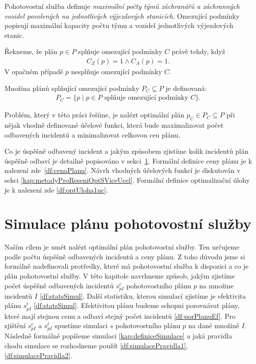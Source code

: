 Pohotovostní služba definuje \textit{maximální počty týmů záchranářů a záchranných vozidel povolených na jednotlivých výjezdových stanicích}.
Omezující podmínky popisují maximální kapacity počtu týmu a vozidel jednotlivých výjezdových stanic.

\begin{definice}
  Řekneme, že plán $p \in P$ splňuje omezující podmínky $C$ právě tehdy, když
  \begin{align*}
    C_Z(p) = 1 \land C_A(p) = 1.
  \end{align*}
  V opačném případě $p$ nesplňuje omezující podmínky $C$.
\end{definice}

\begin{definice}
  Množina plánů splňující omezující podmínky $P_C \subseteq P$ je definovaná:
  \begin{align*}
    P_C = \{ p \mid \text{$p \in P$ splňuje omezující podmínky $C$} \}.
  \end{align*}
\end{definice}

Problém, který v této práci řešíme, je nalézt optimální plán $p_C \in P_C \subseteq P$ při nějak vhodně definované účelové funkci,
která bude maximalizovat počet odbavených incidentů a minimalizovat celkovou ceu plánu.

Co je úspěšně odbavený incident a jakým způsobem zjistíme kolik incidentů plán úspěšně odbaví je detailně popisováno v sekci~\ref{SimulaceKap}.
Formální definice ceny plánu je k nalezení zde~\ref{df:cenaPlanu}.
Návrh vhodných účelových funkcí je diskutován v sekci \ref{kap:metodyProReseniOptSViceUcel}.
Formální definice optimalizační úlohy je k nalezení zde \ref{df:optUloha1uc}.

\section{Simulace plánu pohotovostní služby}\label{SimulaceKap}

Naším cílem je umět nalézt optimální plán pohotovostní služby.
Ten určujeme podle počtu úspěšně odbavených incidentů a ceny plánu.
Z toho důvodu jsme si formálně nadefinovali protředky, které má pohotovostní služba k dispozici a co je plán pohotovostní služby.
V této kapitole navrhneme způsob, jakým zjistíme počet úspěšně odbavených incidentů $s^c_{pI}$ pohotovostního plánu $p$ na množine incidentů $I$ \ref{df:statsSimul}.
Další statistiku, kterou simulací zjistíme je efektivita plánu $s^t_{pI}$ \ref{df:statsSimul}.
Efektivitou plánu budeme schopni porovnávat plány, které mají stejnou cenu a odbaví stejný počet incidentů \ref{df:porPlanuEf}.
Pro zjištění $s^c_{pI}$ a $s^t_{pI}$ spustíme simulaci $s$ pohotovostního plánu $p$ na dané množině $I$.
Následně formálně popíšeme simulaci \ref{kap:definiceSimulace} a jaká pravidla chodu simulace se rozhodneme použít \ref{df:simulacePravidla1}, \ref{df:simulacePravidla2}.

